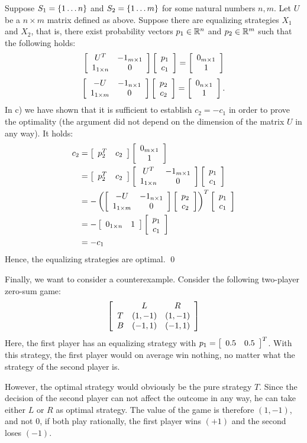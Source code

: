 \documentclass{scrartcl}
\begin{document}
Suppose $S_1 = \set{1\dots n}$ and $S_2 = \set{1 \dots m}$ for some natural 
numbers $n,m$. Let $U$ be a $n\times m$ matrix defined as above.
Suppose there are equalizing strategies $X_1$ and $X_2$, that is, 
there exist probability vectors $p_1\in \Real^n$ and $p_2\in\Real^m$ such that
the following holds:
\[
  \mat{cc}{
    U^T & -1_{m\times 1} \\
    1_{1\times n} & 0
  }
  \mat{c}{p_1 \\ c_1} =
  \mat{c}{0_{m\times 1} \\ 1}
\]
\qquad
\[
  \mat{cc}{
    -U & -1_{n\times 1} \\
    1_{1\times m} & 0
  }
  \mat{c}{p_2 \\ c_2} =
  \mat{c}{0_{n\times 1} \\ 1}.
\]
In c) we have shown that it is sufficient to establish $c_2 = -c_1$ in order 
to prove the optimality (the argument did not depend on the dimension of
the matrix $U$ in any way). It holds:
\begin{align*}
c_2 &= \mat{cc}{p_2^T & c_2} \mat{c}{0_{m\times 1} \\ 1} \\
    &= \mat{cc}{p_2^T & c_2} \mat{cc}{
      U^T & -1_{m\times 1} \\ 1_{1\times n} & 0
    } \mat{c}{p_1 \\ c_1} \\
    &= -\rPar{
      \mat{cc}{-U & -1_{n\times 1} \\ 1_{1\times m} & 0}
      \mat{c}{p_2 \\ c_2}
    }^T \mat{c}{p_1 \\ c_1} \\
    &= - \mat{cc}{0_{1\times n} & 1} \mat{c}{p_1 \\ c_1} \\
    &= - c_1
\end{align*}
Hence, the equalizing strategies are optimal. \hfill \qed

 Finally, we want to consider a counterexample.
Consider the following two-player zero-sum game:
\[
  \mat{ccc}{
       & L        & R \\
     T & (1, -1)  & (1, -1) \\
     B & (-1, 1)  & (-1, 1)
  }
\]
Here, the first player has an equalizing strategy with 
$p_1 = \mat{cc}{0.5 & 0.5}^T$. With this strategy, 
the first player would on average win nothing, 
no matter what the strategy of the second player is.

However, the optimal strategy would obviously be the pure strategy $T$.
Since the decision of the second player can not affect the outcome in any way, 
he can take either $L$ or $R$ as optimal strategy. The value of the game is 
therefore $(1, -1)$, and not $0$, if both play rationally, the first player 
wins $(+1)$ and the second loses $(-1)$.
\end{document}

